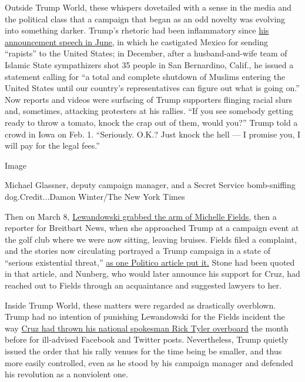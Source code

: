 Outside Trump World, these whispers dovetailed with a sense in the media
and the political class that a campaign that began as an odd novelty was
evolving into something darker. Trump's rhetoric had been inflammatory
since
\href{http://www.nbcnews.com/news/latino/donald-trump-announces-presidential-bid-trashing-mexico-mexicans-n376521}{his
announcement speech in June,} in which he castigated Mexico for sending
``rapists'' to the United States; in December, after a husband-and-wife
team of Islamic State sympathizers shot 35 people in San Bernardino,
Calif., he issued a statement calling for ``a total and complete
shutdown of Muslims entering the United States until our country's
representatives can figure out what is going on.'' Now reports and
videos were surfacing of Trump supporters flinging racial slurs and,
sometimes, attacking protesters at his rallies. ``If you see somebody
getting ready to throw a tomato, knock the crap out of them, would
you?'' Trump told a crowd in Iowa on Feb. 1. ``Seriously. O.K.? Just
knock the hell --- I promise you, I will pay for the legal fees.''

Image

Michael Glassner, deputy campaign manager, and a Secret Service
bomb-sniffing dog.Credit...Damon Winter/The New York Times

Then on March 8,
\href{http://www.nytimes3xbfgragh.onion/2016/03/30/us/politics/trump-campaign-manager-corey-lewandowski.html}{Lewandowski
grabbed the arm of Michelle Fields,} then a reporter for Breitbart News,
when she approached Trump at a campaign event at the golf club where we
were now sitting, leaving bruises. Fields filed a complaint, and the
stories now circulating portrayed a Trump campaign in a state of
``serious existential threat,''
\href{http://www.politico.com/story/2016/03/donald-trump-corey-lewandowski-220742}{as
one Politico article put it.} Stone had been quoted in that article, and
Nunberg, who would later announce his support for Cruz, had reached out
to Fields through an acquaintance and suggested lawyers to her.

Inside Trump World, these matters were regarded as drastically
overblown. Trump had no intention of punishing Lewandowski for the
Fields incident the way
\href{http://www.cnn.com/2016/02/22/politics/rick-tyler-marco-rubio-video-apology/}{Cruz
had thrown his national spokesman Rick Tyler overboard} the month before
for ill-advised Facebook and Twitter posts. Nevertheless, Trump quietly
issued the order that his rally venues for the time being be smaller,
and thus more easily controlled, even as he stood by his campaign
manager and defended his revolution as a nonviolent one.

